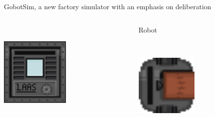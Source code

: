 \begin{frame}{GobotSim, a new factory simulator with an emphasis on deliberation}
\begin{columns}
\begin{column}{0.3\textwidth}
            ~~

            \includegraphics[width = 0.5\textwidth]{images/godot/machine_texture.png}

        \end{column}
        \pause
        \begin{column}{0.3\textwidth}
            \centering
            Robot

            ~~

            \includegraphics[width = 0.5\textwidth]{images/godot/robot_texture.png}
        \end{column}
    \end{columns}

            


\end{frame}

